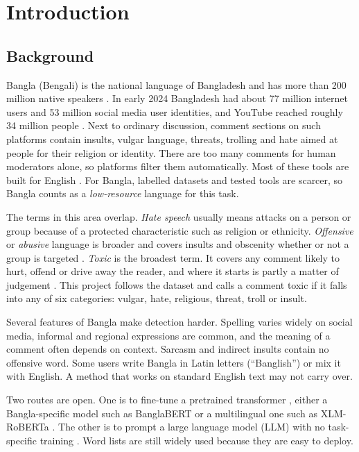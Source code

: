 \chapter{Introduction}
\justifying

\section{Background}

Bangla (Bengali) is the national language of Bangladesh and has more than 200 million native speakers \cite{belal2023toxic}. In early 2024 Bangladesh had about 77 million internet users and 53 million social media user identities, and YouTube reached roughly 34 million people \cite{datareportal2024}. Next to ordinary discussion, comment sections on such platforms contain insults, vulgar language, threats, trolling and hate aimed at people for their religion or identity. There are too many comments for human moderators alone, so platforms filter them automatically. Most of these tools are built for English \cite{schmidt2017survey,fortuna2018survey}. For Bangla, labelled datasets and tested tools are scarcer, so Bangla counts as a \emph{low-resource} language for this task.

The terms in this area overlap. \emph{Hate speech} usually means attacks on a person or group because of a protected characteristic such as religion or ethnicity. \emph{Offensive} or \emph{abusive} language is broader and covers insults and obscenity whether or not a group is targeted \cite{davidson2017automated}. \emph{Toxic} is the broadest term. It covers any comment likely to hurt, offend or drive away the reader, and where it starts is partly a matter of judgement \cite{belal2023toxic}. This project follows the dataset and calls a comment toxic if it falls into any of six categories: vulgar, hate, religious, threat, troll or insult.

Several features of Bangla make detection harder. Spelling varies widely on social media, informal and regional expressions are common, and the meaning of a comment often depends on context. Sarcasm and indirect insults contain no offensive word. Some users write Bangla in Latin letters (``Banglish'') or mix it with English. A method that works on standard English text may not carry over.

Two routes are open. One is to fine-tune a pretrained transformer \cite{vaswani2017attention,devlin2019bert}, either a Bangla-specific model such as BanglaBERT \cite{sarker2020banglabert} or a multilingual one such as XLM-RoBERTa \cite{conneau2020xlmr}. The other is to prompt a large language model (LLM) with no task-specific training \cite{brown2020gpt3}. Word lists are still widely used because they are easy to deploy.

